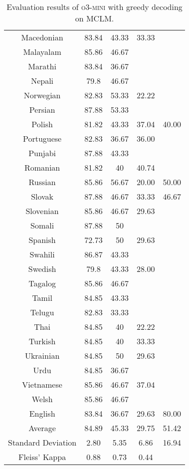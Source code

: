 \begin{table*}[]
\begin{tabular}{c|cccc}
Macedonian & 83.84 & 43.33 & 33.33 &  \\
Malayalam & 85.86 & 46.67 & \multicolumn{1}{l}{} &  \\
Marathi & 83.84 & 36.67 & \multicolumn{1}{l}{} &  \\
Nepali & 79.8 & 46.67 & \multicolumn{1}{l}{} &  \\
Norwegian & 82.83 & 53.33 & 22.22 &  \\
Persian & 87.88 & 53.33 & \multicolumn{1}{l}{} &  \\
Polish & 81.82 & 43.33 & 37.04 & 40.00 \\
Portuguese & 82.83 & 36.67 & 36.00 &  \\
Punjabi & 87.88 & 43.33 & \multicolumn{1}{l}{} &  \\
Romanian & 81.82 & 40 & 40.74 &  \\
Russian & 85.86 & 56.67 & 20.00 & 50.00 \\
Slovak & 87.88 & 46.67 & 33.33 & 46.67 \\
Slovenian & 85.86 & 46.67 & 29.63 &  \\
Somali & 87.88 & 50 & \multicolumn{1}{l}{} &  \\
Spanish & 72.73 & 50 & 29.63 &  \\
Swahili & 86.87 & 43.33 & \multicolumn{1}{l}{} &  \\
Swedish & 79.8 & 43.33 & 28.00 &  \\
Tagalog & 85.86 & 46.67 & \multicolumn{1}{l}{} &  \\
Tamil & 84.85 & 43.33 & \multicolumn{1}{l}{} &  \\
Telugu & 82.83 & 33.33 & \multicolumn{1}{l}{} &  \\
Thai & 84.85 & 40 & 22.22 &  \\
Turkish & 84.85 & 40 & 33.33 &  \\
Ukrainian & 84.85 & 50 & 29.63 &  \\
Urdu & 84.85 & 36.67 & \multicolumn{1}{l}{} &  \\
Vietnamese & 85.86 & 46.67 & 37.04 &  \\
Welsh & 85.86 & 46.67 & \multicolumn{1}{l}{} &  \\
\rowcolor[HTML]{FCE5CD} 
\cellcolor[HTML]{FCE5CD}English & 83.84 & 36.67 & 29.63 & 80.00 \\ \midrule
Average & 84.89 & 45.33 & 29.75 & 51.42 \\
Standard Deviation & 2.80 & 5.35 & 6.86 & 16.94 \\
Fleiss' Kappa & 0.88 & 0.73 & 0.44 & \\ \bottomrule
\end{tabular}
\caption{\footnotesize Evaluation results of \textsc{o3-mini} with greedy decoding on MCLM.}
\label{tab:o3_mini_result}
\end{table*}